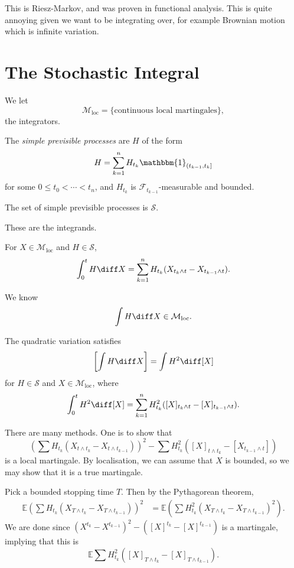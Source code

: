 \documentclass[12pt]{article}
\begin{document}
This is Riesz-Markov, and was proven in functional analysis. This is quite annoying given we want to be integrating over, for example Brownian motion which is infinite variation.

\newpage

\section{The Stochastic Integral}%
\label{sec:si}

We let
\[
	\mathcal{M}_{\mathrm{loc}} = \{\text{continuous local martingales}\},
\]
the integrators.

\begin{definition}
	The \emph{simple previsible processes} are $H$ of the form
	\[
		H = \sum_{k = 1}^{n} H_{t_k} \mathbbm{1}_{(t_{k-1}, t_k]}
	\]
	for some $0 \leq t_0 < \cdots < t_n$, and $H_{t_k}$ is $\mathcal{F}_{t_{k-1}}$-measurable and bounded.

	The set of simple previsible processes is $\mathcal{S}$.
\end{definition}
These are the integrands.

\begin{definition}
	For $X \in \mathcal{M}_{\mathrm{loc}}$ and $H \in \mathcal{S}$,
	\[
	\int_0^t H \diff X = \sum_{k = 1}^{n} H_{t_k}(X_{t_k \wedge t} - X_{t_{k-1} \wedge t}).
	\]
\end{definition}

\begin{remark}
	We know
	\[
	\int H \diff X \in \mathcal{M}_{\mathrm{loc}}.
	\]	
\end{remark}

\begin{proposition}
	The quadratic variation satisfies
	\[
		\left[ \int H \diff X \right] = \int H^2 \diff [X]
	\]
	for $H \in \mathcal{S}$ and $X \in \mathcal{M}_{\mathrm{loc}}$, where
	\[
		\int_0^t H^2 \diff [X] = \sum_{k = 1}^{n} H_{t_k}^2 ([X]_{t_k \wedge t} - [X]_{t_{k-1} \wedge t}).
	\]
\end{proposition}

\begin{proofbox}
	There are many methods. One is to show that
	\[
		\left( \sum H_{t_k} (X_{t \wedge t_k} - X_{t \wedge t_{k-1}}) \right)^2 - \sum H_{t_k}^2 ([X]_{t \wedge t_k} - [X_{t_{k-1} \wedge t}])
	\]
	is a local martingale. By localisation, we can assume that $X$ is bounded, so we may show that it is a true martingale.

	Pick a bounded stopping time $T$. Then by the Pythagorean theorem,
	\begin{align*}
		\mathbb{E} \left( \sum H_{t_k} (X_{T \wedge t_k} - X_{T \wedge t_{k-1}} ) \right)^2 &= \mathbb{E} \left( \sum H_{t_k}^2 (X_{T \wedge t_k} - X_{T \wedge t_{k-1}})^2 \right).
	\end{align*}
	We are done since $(X^{t_k} - X^{t_{k-1}})^2 - ([X]^{t_k} - [X]^{t_{k-1}})$ is a martingale, implying that this is
	\[
		\mathbb{E} \sum H_{t_k}^2 ([X]_{T \wedge t_k} - [X]_{T \wedge t_{k-1}}).
	\]
\end{proofbox}
\end{document}
